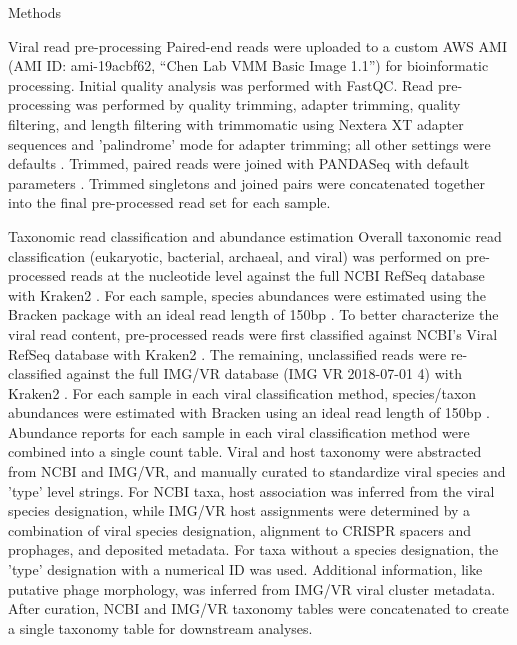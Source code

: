 \documentclass[oneside,12pt,final]{sty/ucthesis-CA2012}
\begin{document}
\begin{mainmatter}
\begin{section}{Methods}
\begin{subsection}{Viral read pre-processing}
Paired-end reads were uploaded to a custom AWS AMI (AMI ID: ami-19acbf62, “Chen Lab VMM Basic Image 1.1”) for bioinformatic processing. Initial quality analysis was performed with FastQC. Read pre-processing was performed by quality trimming, adapter trimming, quality filtering, and length filtering with trimmomatic using Nextera XT adapter sequences and 'palindrome' mode for adapter trimming; all other settings were defaults \cite{RN82}. Trimmed, paired reads were joined with PANDASeq with default parameters \cite{RN176}. Trimmed singletons and joined pairs were concatenated together into the final pre-processed read set for each sample. 
\end{subsection}

\begin{subsection}{Taxonomic read classification and abundance estimation}
Overall taxonomic read classification (eukaryotic, bacterial, archaeal, and viral) was performed on pre-processed reads at the nucleotide level against the full NCBI RefSeq database with Kraken2 \cite{RN174, RN172}. For each sample, species abundances were estimated using the Bracken package with an ideal read length of 150bp \cite{RN173}. To better characterize the viral read content, pre-processed reads were first classified against NCBI's Viral RefSeq database with Kraken2 \cite{RN175, RN172}. The remaining, unclassified reads were re-classified against the full IMG/VR database (IMG VR 2018-07-01 4) with Kraken2 \cite{RN78, RN172}. For each sample in each viral classification method, species/taxon abundances were estimated with Bracken using an ideal read length of 150bp \cite{RN173}. Abundance reports for each sample in each viral classification method were combined into a single count table. Viral and host taxonomy were abstracted from NCBI and IMG/VR, and manually curated to standardize viral species and 'type' level strings. For NCBI taxa, host association was inferred from the viral species designation, while IMG/VR host assignments were determined by a combination of viral species designation, alignment to CRISPR spacers and prophages, and deposited metadata. For taxa without a species designation, the 'type' designation with a numerical ID was used. Additional information, like putative phage morphology, was inferred from IMG/VR viral cluster metadata. After curation, NCBI and IMG/VR taxonomy tables were concatenated to create a single taxonomy table for downstream analyses.
\end{subsection}


\end{section}
\end{mainmatter}
\end{document}
